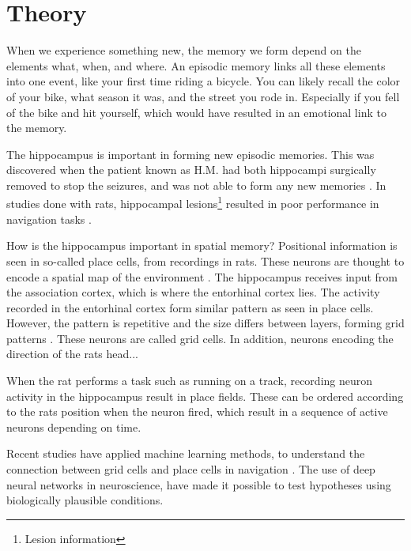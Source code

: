 \section{Theory}\label{sec:theory}
When we experience something new, the memory we form depend on the elements what, when, and where. An episodic memory links all these elements into one event, like your first time riding a bicycle. You can likely recall the color of your bike, what season it was, and the street you rode in. Especially if you fell of the bike and hit yourself, which would have resulted in an emotional link to the memory.

The hippocampus is important in forming new episodic memories. This was discovered when the patient known as H.M. had both hippocampi surgically removed to stop the seizures, and was not able to form any new memories \cite{scoville:1957:loss_recent}. In studies done with rats, hippocampal lesions\footnote{Lesion information} resulted in poor performance in navigation tasks \cite{kaada:1961:maze, schlesiger:2013:hippocampal_activation_maze}. 

How is the hippocampus important in spatial memory? Positional information is seen in so-called place cells, from recordings in rats. These neurons are thought to encode a spatial map of the environment \cite{okeefe:1978:hippocampus}. The hippocampus receives input from the association cortex, which is where the entorhinal cortex lies. The activity recorded in the entorhinal cortex form similar pattern as seen in place cells. However, the pattern is repetitive and the size differs between layers, forming grid patterns \cite{hafting:2005:microstructure}. These neurons are called grid cells. In addition, neurons encoding the direction of the rats head...

When the rat performs a task such as running on a track, recording neuron activity in the hippocampus result in place fields. These can be ordered according to the rats position when the neuron fired, which result in a sequence of active neurons depending on time.

Recent studies have applied machine learning methods, to understand the connection between grid cells and place cells in navigation \cite{banino:2018:vector_based}. The use of deep neural networks in neuroscience, have made it possible to test hypotheses using biologically plausible conditions. 

